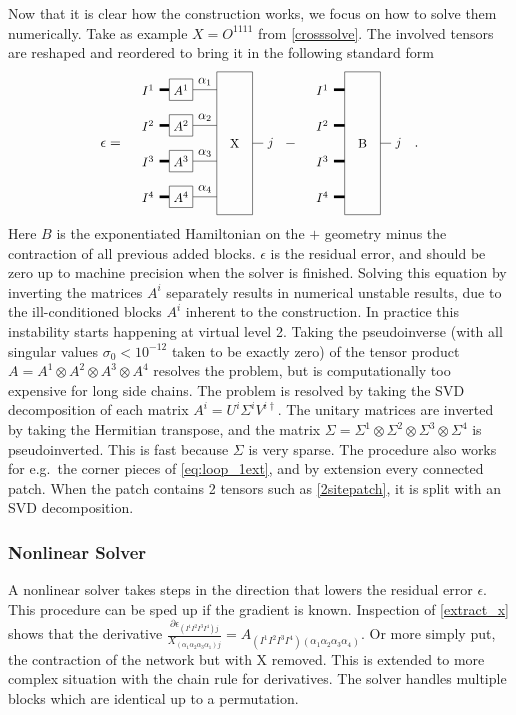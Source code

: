 \documentclass[twocolumn]{article}
\newcounter{a}
\newcounter{b}
\begin{document}
Now that it is clear how  the construction works, we focus on how to solve them numerically. Take as example  $X=O^{1 1 1 1}$ from \cref{crosssolve}. The involved tensors are reshaped and reordered to bring it in the following standard form
\begin{equation} \label{extract_x}
    \epsilon =  \vcenter{\hbox{  \scalebox{0.9}{ \pepoct }} } - \vcenter{\hbox{  \scalebox{0.9}{ \blockct } }} .
\end{equation}
Here $B$ is the exponentiated Hamiltonian on the $+$ geometry minus the contraction of all previous added blocks. $\epsilon$ is the residual error, and should be zero up to machine precision when the solver is finished. Solving this equation by inverting the matrices $A^i$ separately results in numerical unstable results, due to the ill-conditioned blocks $A^i$ inherent to the construction. In practice this instability starts happening at virtual level 2. Taking the pseudoinverse (with all singular values $\sigma_0<10^{-12}$ taken to be exactly zero) of the tensor product  $A = A^1 \otimes A^2 \otimes A^3 \otimes A^4$  resolves the problem, but is  computationally too expensive for long side chains. The problem is resolved by taking the SVD decomposition of each matrix $A^i = U^i \Sigma^i V^{i \dagger}$. The unitary matrices are inverted by taking the Hermitian transpose, and the matrix $\Sigma = \Sigma^1 \otimes \Sigma^2 \otimes \Sigma^3 \otimes \Sigma^4$ is pseudoinverted. This is fast because $\Sigma$ is very sparse. The procedure also works for e.g.\ the corner pieces of \cref{eq:loop_1ext}, and by extension every connected patch. When the patch contains 2 tensors such as \cref{2sitepatch}, it is split with an SVD decomposition.

\subsubsection{Nonlinear Solver}
A nonlinear solver takes steps in the direction that lowers the residual error $\epsilon$. This procedure can be sped up if the gradient is known. Inspection of \cref{extract_x} shows that the derivative  $\frac{\partial  \epsilon_{ (I^1 I^2 I^3 I^4) j }  }  { X_{ (\alpha_1 \alpha_2 \alpha_3 \alpha_1)  j } }   = A_{ (I^1 I^2 I^3 I^4) (\alpha_1 \alpha_2 \alpha_3 \alpha_4) } $. Or more simply put, the contraction of the network but with X removed. This is extended to more complex situation with the chain rule for derivatives. The solver handles multiple blocks which are identical up to a permutation.
\end{document}
